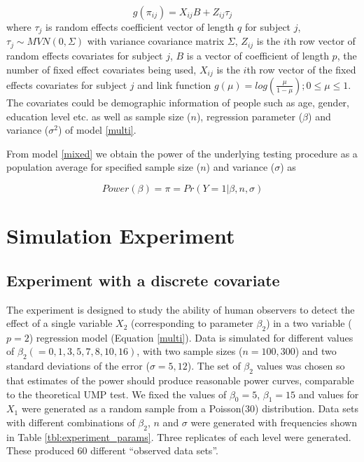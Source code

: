 \documentclass{article}
\begin{document}
\begin{equation}
g(\pi_{ij}) = X_{ij}B  + Z_{ij} \tau_j 
\label{mixed} 
\end{equation}
%
where $\tau_j$ is random effects coefficient vector of length $q$ for subject $j$,  $\tau_j  \sim  MVN(0,\Sigma)$ with variance covariance matrix $\Sigma$, $Z_{ij}$ is the $i$th row vector of random effects covariates for subject $j$, $B$ is a vector of coefficient of length $p$, the number of fixed effect covariates being used, $X_{ij}$ is the $i$th row vector of the fixed effects covariates for subject $j$ and link function $g(\mu)=log(\frac{\mu}{1-\mu}); 0 \le \mu \le 1$. The covariates could be demographic information of people such as age, gender, education level etc. as well as sample size ($n$), regression parameter ($\beta$) and variance ($\sigma^2$) of model \ref{multi}. 

From model \ref{mixed} we obtain %
the power of the underlying testing procedure as a population average %
for specified sample size ($n$) and  variance ($\sigma$)  as 

\begin{equation}\label{eqn:power} 
Power(\beta) = \pi=Pr(Y=1|\beta, n, \sigma) 
\end{equation}


\section{Simulation Experiment} \label{sec:simulation}

\subsection{Experiment with a discrete covariate}

The experiment is designed to study the ability of human observers to detect the effect of a single variable $X_2$ (corresponding to parameter $\beta_2$) in a two variable ($p=2$) regression model (Equation \eqref{multi}). Data is simulated for different values of $\beta_2 (=0, 1, 3, 5, 7, 8, 10, 16)$, with two sample sizes ($n=100, 300$) and two standard deviations of the error ($\sigma=5, 12$). The set of $\beta_2$ values was chosen so that estimates of the power should produce reasonable power curves, comparable to the theoretical UMP test. We fixed the values of $\beta_0 = 5$,  $\beta_1=15$ and values for $X_1$ were generated as a random sample from a Poisson(30) distribution. Data sets with different combinations of $\beta_2$,  $n$ and $\sigma$ were generated with frequencies shown in Table \ref{tbl:experiment_params}. Three replicates of each level were generated. These produced 60 different ``observed data sets''. 
\end{document}
